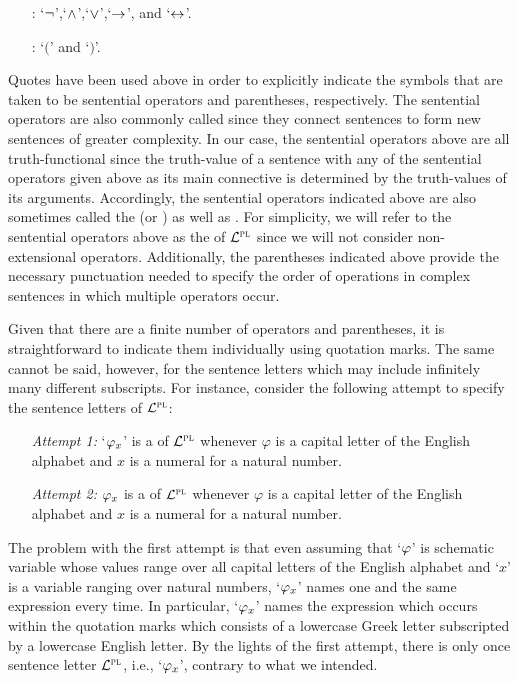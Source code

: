 \begin{enumerate}[leftmargin=2.25in, itemsep=-.4em]
  \item[\define{sentential operators}:] `$\neg$',`$\wedge$',`$\vee$',`$\rightarrow$', and `$\leftrightarrow$'.
  \item[\define{punctuation}:] `$($' and `$)$'.
\end{enumerate}

Quotes have been used above in order to explicitly indicate the symbols that are taken to be sentential operators and parentheses, respectively.
The sentential operators are also commonly called  since they connect sentences to form new sentences of greater complexity.
In our case, the sentential operators above are all truth-functional since the truth-value of a sentence with any of the sentential operators given above as its main connective is determined by the truth-values of its arguments.
Accordingly, the sentential operators indicated above are also sometimes called the  (or ) as well as .
For simplicity, we will refer to the sentential operators above as the  of $\mathcal{L}^{\textsc{pl}}$ since we will not consider non-extensional operators.
Additionally, the parentheses indicated above provide the necessary punctuation needed to specify the order of operations in complex sentences in which multiple operators occur.

Given that there are a finite number of operators and parentheses, it is straightforward to indicate them individually using quotation marks.
The same cannot be said, however, for the sentence letters which may include infinitely many different subscripts.
For instance, consider the following attempt to specify the sentence letters of $\mathcal{L}^{\textsc{pl}}$:

\begin{enumerate}[leftmargin=1.25in, itemsep=-.4em]
  \item[\it Attempt 1:] `$\varphi_x$' is a  of $\mathcal{L}^{\textsc{pl}}$ whenever $\varphi$ is a capital letter of the English alphabet and $x$ is a numeral for a natural number. 
  \item[\it Attempt 2:] $\varphi_x$ is a  of $\mathcal{L}^{\textsc{pl}}$ whenever $\varphi$ is a capital letter of the English alphabet and $x$ is a numeral for a natural number. 
\end{enumerate}

The problem with the first attempt is that even assuming that `$\varphi$' is schematic variable whose values range over all capital letters of the English alphabet and `$x$' is a variable ranging over natural numbers, `$\varphi_x$' names one and the same expression every time.
In particular, `$\varphi_x$' names the expression which occurs within the quotation marks which consists of a lowercase Greek letter subscripted by a lowercase English letter.
By the lights of the first attempt, there is only once sentence letter $\mathcal{L}^{\textsc{pl}}$, i.e., `$\varphi_x$', contrary to what we intended.

